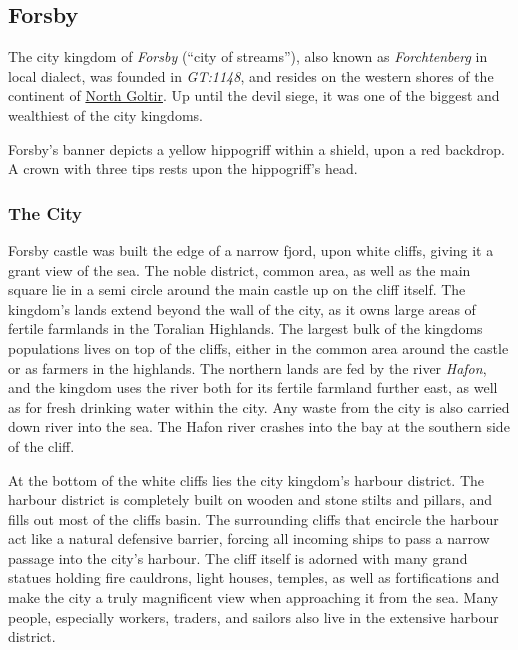 \FloatBarrier
\clearpage

\subsection{Forsby}
\label{sec:Forsby}


The city kingdom of \emph{Forsby} (``city of streams''), also known as
\emph{Forchtenberg} in local dialect, was founded in \emph{GT:1148}, and
resides on the western shores of the continent of \hyperref[sec:Goltir]{North
Goltir}. Up until the devil siege, it was one of the biggest and wealthiest
of the city kingdoms.

Forsby's banner depicts a yellow hippogriff within a shield, upon a red
backdrop. A crown with three tips rests upon the hippogriff's head.

\subsubsection{The City}

Forsby castle was built the edge of a narrow fjord, upon white cliffs, giving
it a grant view of the sea. The noble district, common area, as well as the
main square lie in a semi circle around the main castle up on the cliff
itself. The kingdom's lands extend beyond the wall of the city, as it owns
large areas of fertile farmlands in the Toralian Highlands. The largest
bulk of the kingdoms populations lives on top of the cliffs, either in the
common area around the castle or as farmers in the highlands. The northern
lands are fed by the river \emph{Hafon}, and the kingdom uses the river both
for its fertile farmland further east, as well as for fresh drinking water
within the city. Any waste from the city is also carried down river into the
sea. The Hafon river crashes into the bay at the southern side of the cliff.

At the bottom of the white cliffs lies the city kingdom's harbour district. The
harbour district is completely built on wooden and stone stilts and pillars,
and fills out most of the cliffs basin. The surrounding cliffs that encircle
the harbour act like a natural defensive barrier, forcing all incoming ships
to pass a narrow passage into the city's harbour. The cliff itself is adorned
with many grand statues holding fire cauldrons, light houses, temples, as well
as fortifications and make the city a truly magnificent view when approaching
it from the sea. Many people, especially workers, traders, and sailors also
live in the extensive harbour district.

